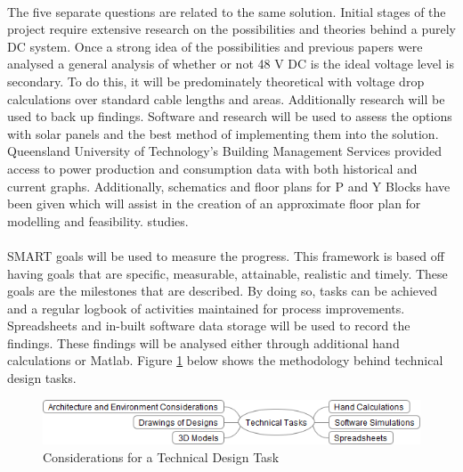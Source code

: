 \paragraph{}
The five separate questions are related to the same solution. Initial stages of the project require extensive research on the possibilities and theories behind a purely DC system. Once a strong idea of the possibilities and previous papers were analysed a general analysis of whether or not 48 V DC is the ideal voltage level is secondary. To do this, it will be predominately theoretical with voltage drop calculations over standard cable lengths and areas. Additionally research will be used to back up findings. Software and research will be used to assess the options with solar panels and the best method of implementing them into the solution. Queensland University of Technology's Building Management Services provided access to power production and consumption data with both historical and current graphs. Additionally, schematics and floor plans for P and Y Blocks have been given which will assist in the creation of an approximate floor plan for modelling and feasibility. studies.   

\paragraph{}
SMART goals will be used to measure the progress. This framework is based off having goals that are specific, measurable, attainable, realistic and timely. These goals are the milestones that are described. By doing so, tasks can be achieved and a regular logbook of activities maintained for process improvements. Spreadsheets and in-built software data storage will be used to record the findings. These findings will be analysed either through additional hand calculations or Matlab. Figure \ref{fig:PracProcedure} below shows the methodology behind technical design tasks.    

\begin{figure}[H]
\hfill\includegraphics[width = 160mm]{images/Practical_Planning_Rev2}\hspace*{\fill}
\caption{Considerations for a Technical Design Task}
\label{fig:PracProcedure}
\end{figure}     

\newpage

